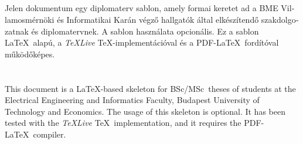 \begin{otherlanguage}{magyar}

  \chapter{\abstractname}

  Jelen dokumentum egy diplomaterv sablon, amely formai keretet ad a BME
  Villamosmérnöki és Informatikai Karán végző hallgatók által
  elkészítendő szakdolgozatnak és diplomatervnek. A sablon használata
  opcionális. Ez a sablon \LaTeX~alapú, a \emph{TeXLive}
  \TeX-implementációval és a PDF-\LaTeX~fordítóval működőképes.

\end{otherlanguage}

\chapter{\abstractname}

This document is a \LaTeX-based skeleton for BSc/MSc~theses of
students at the Electrical Engineering and Informatics Faculty,
Budapest University of Technology and Economics. The usage of this
skeleton is optional. It has been tested with the \emph{TeXLive}
\TeX~implementation, and it requires the PDF-\LaTeX~compiler.


